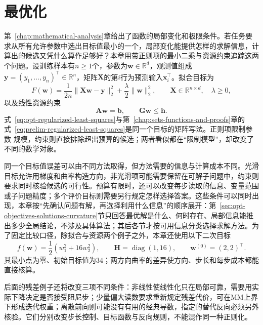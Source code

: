 \chapter{最优化}
\label{chap:optimization}

第~\ref{chap:mathematical-analysis}章给出了函数的局部变化和极限条件。若任务要求从所有允许参数中选出目标值最小的一个，局部变化能提供怎样的求解信息，计算出的候选又凭什么算作足够好？本章用带正则项的最小二乘与资源约束追踪这两个问题。设训练样本有$n\geq1$个，参数为$\bm w\in\mathbb R^d$，观测值组成$\bm y=(y_1,\ldots,y_n)^\top\in\mathbb R^n$，矩阵$\bm X$的第$i$行为预测输入$\bm x_i^\top$。拟合目标为
\begin{equation}
  F(\bm{w})
  =
  \frac{1}{2n}\lVert \bm{X}\bm{w}-\bm{y}\rVert_2^2
  +\frac{\lambda}{2}\lVert\bm{w}\rVert_2^2,
  \qquad
  \bm{X}\in\mathbb{R}^{n\times d},\quad \lambda\geq 0,
  \label{eq:opt-regularized-least-squares}
\end{equation}
以及线性资源约束
\begin{equation}
  \bm{A}\bm{w}=\bm{b},\qquad
  \bm{G}\bm{w}\leq\bm{h}.
  \label{eq:opt-linear-resource-constraints}
\end{equation}
式~\eqref{eq:opt-regularized-least-squares}与第~\ref{chap:sets-functions-and-proofs}章的
式~\eqref{eq:prelim-regularized-least-squares}是同一个目标的矩阵写法。正则项限制参数
规模，约束则直接排除超出预算的候选；两者看似都在“限制模型”，却改变了不同的数学对象。

同一个目标值误差可以由不同方法取得，但方法需要的信息与计算成本不同。光滑目标允许用梯度和曲率构造方向，非光滑项可能需要保留在可解子问题中，约束则要求同时核验候选的可行性。预算有限时，还可以改变每步读取的信息、变量范围或子问题精度；多个评价目标则需要另行规定怎样选择答案。这些条件可以同时出现，本章按“先确认问题有解，再选择利用什么信息”的顺序展开：第~\ref{sec:opt-objectives-solutions-curvature}节只回答最优解是什么、何时存在、局部信息能推出多少全局结论，不涉及具体算法；其后各节才按可用信息分类选择求解方法。为了固定比较口径，除拟合与资源两个例子之外，本章还使用以下二次目标
\begin{equation}
 f(\bm w)=\frac12(w_1^2+16w_2^2),\qquad
 \bm H=\operatorname{diag}(1,16),\qquad
 \bm w^{(0)}=(2,2)^\top.
 \label{eq:opt-common-quadratic}
\end{equation}
其最小点为零、初始目标值为$34$；两方向曲率的差异使方向、步长和每步成本都能直接核算。

后面的残差例子还将改变三项不同条件：非线性使线性化只在局部可靠，需要用实际下降决定是否接受阻尼步；少量偏大读数要求重新规定残差代价，可在MM上界下形成迭代权重；离散前向则可能没有有用的经典导数，指定的替代反向必须另外核验。它们分别改变步长控制、目标函数与反向规则，不能混作同一种正则化。

